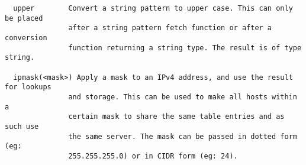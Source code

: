 \begin{verbatim}
  upper        Convert a string pattern to upper case. This can only be placed
               after a string pattern fetch function or after a conversion
               function returning a string type. The result is of type string.

  ipmask(<mask>) Apply a mask to an IPv4 address, and use the result for lookups
               and storage. This can be used to make all hosts within a
               certain mask to share the same table entries and as such use
               the same server. The mask can be passed in dotted form (eg:
               255.255.255.0) or in CIDR form (eg: 24).
               
               \end{verbatim}